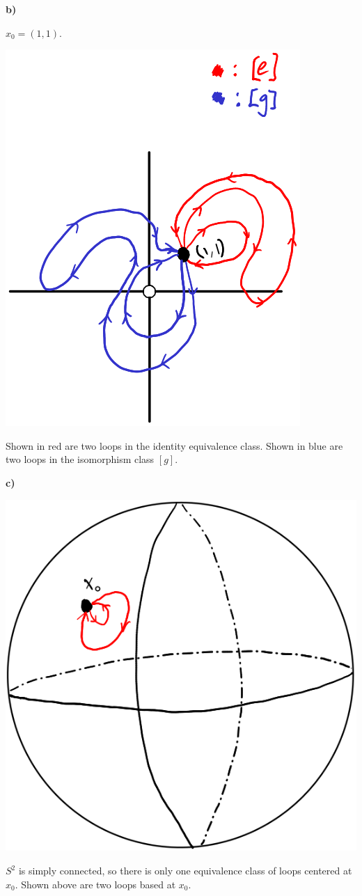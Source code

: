 \documentclass[12pt]{report}
\begin{document}
\medskip\noindent\textbf{b)}

    $x_0 = (1,1)$.
    \begin{center}\includegraphics{2.png}\end{center}
    Shown in red are two loops in the identity equivalence class.
    Shown in blue are two loops in the isomorphism class $[g]$.

\newpage\noindent\textbf{c)}

    \begin{center}\includegraphics[scale=.6]{3.png}\end{center}
    $S^2$ is simply connected, so there is only one equivalence class of loops centered at $x_0$.
    Shown above are two loops based at $x_0$.
\end{document}
